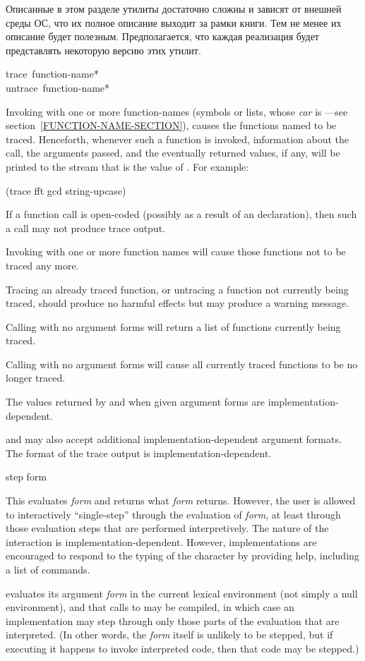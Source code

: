 Описанные в этом разделе утилиты достаточно сложны и зависят от внешней среды
ОС, что их полное описание выходит за рамки книги. Тем не менее их описание
будет полезным. Предполагается, что каждая реализация будет представлять
некоторую версию этих утилит.

\begin{defmac}
trace {\,function-name}* \\
untrace {\,function-name}*

Invoking  with one or more function-names (symbols or lists, whose
\emph{car} is ---see section~\ref{FUNCTION-NAME-SECTION}),
 causes
the functions named to be traced.  Henceforth, whenever such
a function is invoked, information about the call, the arguments
passed, and the eventually returned values, if any, will be printed
to the stream that is the value of .
For example:
\begin{lisp}
(trace fft gcd string-upcase)
\end{lisp}
If a function call is open-coded (possibly as a result of an 
declaration), then such a call may not produce trace output.

Invoking  with one or more function names will cause those
functions not to be traced any more.

Tracing an already traced function, or untracing a function not
currently being traced, should produce no harmful effects but may
produce a warning message.

Calling  with no argument forms will return a list of functions
currently being traced.

Calling  with no argument forms will cause all currently
traced functions to be no longer traced.

The values returned by  and  when
given argument forms are implementation-dependent.

 and  may also accept additional
implementation-dependent argument formats.  The format of the trace
output is implementation-dependent.
\end{defmac}

\begin{defmac}
step form

This evaluates \emph{form} and returns what \emph{form} returns.
However, the user is allowed to interactively
``single-step'' through the evaluation of \emph{form}, at least
through those evaluation steps that are performed interpretively.
The nature of the interaction is implementation-dependent.
However, implementations are encouraged to respond to the typing
of the character  by providing help, including a list
of commands.

 evaluates its argument \emph{form}
in the current lexical environment (not simply a null environment),
and that calls to  may be compiled, in which case
an implementation may step through only those parts of the
evaluation that are interpreted.  (In other words, the \emph{form}
itself is unlikely to be stepped, but if executing it happens to
invoke interpreted code, then that code may be stepped.)
\end{defmac}

